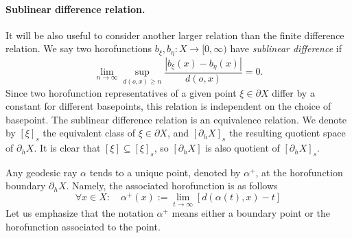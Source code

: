 \documentclass{amsart}
\theoremstyle{definition}
\theoremstyle{remark}
\newcommand{\U}{ X}
\newcommand{\hU}{\partial_h{  X}}
\newcommand{\pU}{\partial{  X}}
\begin{document}
\paragraph{\textbf{Sublinear difference relation}.} It will be also useful to consider another larger relation than the finite difference relation. We say two horofunctions $b_\xi,b_\eta: \U\to [0,\infty)$ have  \textit{sublinear difference} if 
\begin{equation}\label{SublinearDiff}
\lim_{n\to\infty}\sup_{d(o,x)\ge n} \frac{|b_\xi(x)-b_\eta(x)|}{d(o,x)}=0.   
\end{equation}
Since two horofunction representatives of a given point $\xi\in \pU$ differ by a constant for different basepoints, this relation is independent on the choice of basepoint. The sublinear difference relation is an equivalence relation. We denote by $[\xi]_s$ the  equivalent class of $\xi\in \pU$, and $[\hU]_s$ the resulting quotient space of $\hU$. It is clear that $[\xi]\subseteq [\xi]_s$, so $[\hU]$ is also quotient of $[\hU]_s$.  %

Any geodesic ray $\alpha$ tends to a unique point, denoted by $\alpha^+$, at the horofunction boundary $\hU$. Namely, the associated horofunction is as follows
\begin{equation}\label{defn:busemanfunc}
\forall x\in X: \quad \alpha^+(x):=\lim_{t\to\infty} [d(\alpha(t),x)-t]    
\end{equation}
Let us emphasize that the notation $\alpha^+$  means either a boundary point or the horofunction associated to the point. 
\end{document}
